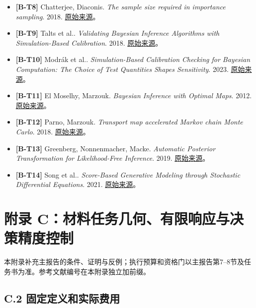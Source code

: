\documentclass[
  11pt,
  a4paper,
]{article}
\begin{document}
\begin{itemize}
\item
  \textbf{{[}B-T8{]}} Chatterjee, Diaconis. \emph{The sample size
  required in importance sampling}. 2018.
  \href{https://arxiv.org/abs/1511.01437}{原始来源}。
\item
  \textbf{{[}B-T9{]}} Talts et al.. \emph{Validating Bayesian Inference
  Algorithms with Simulation-Based Calibration}. 2018.
  \href{https://arxiv.org/abs/1804.06788}{原始来源}。
\item
  \textbf{{[}B-T10{]}} Modrák et al.. \emph{Simulation-Based Calibration
  Checking for Bayesian Computation: The Choice of Test Quantities
  Shapes Sensitivity}. 2023.
  \href{https://arxiv.org/abs/2211.02383}{原始来源}。
\item
  \textbf{{[}B-T11{]}} El Moselhy, Marzouk. \emph{Bayesian Inference
  with Optimal Maps}. 2012.
  \href{https://arxiv.org/abs/1109.1516}{原始来源}。
\item
  \textbf{{[}B-T12{]}} Parno, Marzouk. \emph{Transport map accelerated
  Markov chain Monte Carlo}. 2018.
  \href{https://arxiv.org/abs/1412.5492}{原始来源}。
\item
  \textbf{{[}B-T13{]}} Greenberg, Nonnenmacher, Macke. \emph{Automatic
  Posterior Transformation for Likelihood-Free Inference}. 2019.
  \href{https://proceedings.mlr.press/v97/greenberg19a.html}{原始来源}。
\item
  \textbf{{[}B-T14{]}} Song et al.. \emph{Score-Based Generative
  Modeling through Stochastic Differential Equations}. 2021.
  \href{https://arxiv.org/abs/2011.13456}{原始来源}。
\end{itemize}

\hypertarget{ux9644ux5f55-cux6750ux6599ux4efbux52a1ux51e0ux4f55ux6709ux9650ux54cdux5e94ux4e0eux51b3ux7b56ux7cbeux5ea6ux63a7ux5236}{%
\section{附录
C：材料任务几何、有限响应与决策精度控制}\label{ux9644ux5f55-cux6750ux6599ux4efbux52a1ux51e0ux4f55ux6709ux9650ux54cdux5e94ux4e0eux51b3ux7b56ux7cbeux5ea6ux63a7ux5236}}

本附录补充主报告的条件、证明与反例；执行预算和资格门以主报告第7--8节及任务书为准。参考文献编号在本附录独立加前缀。

\hypertarget{c.2-ux56faux5b9aux5b9aux4e49ux548cux5b9eux9645ux8d39ux7528}{%
\subsection{C.2
固定定义和实际费用}\label{c.2-ux56faux5b9aux5b9aux4e49ux548cux5b9eux9645ux8d39ux7528}}
\end{document}
